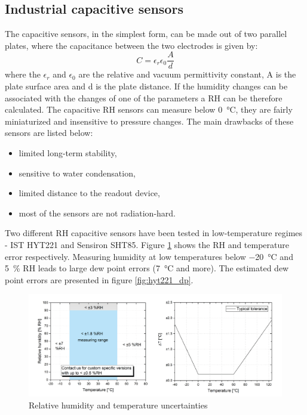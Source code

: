 \subsection{Industrial capacitive sensors}
\label{capacitive_sensors}
The capacitive sensors, in the simplest form, can be made out of two parallel plates, where the capacitance between the two electrodes is given by:
\begin{equation}
C = \epsilon_{r}\epsilon_0\frac{A}{d}
\end{equation}
where the $\epsilon_{r}$ and $\epsilon_{0}$ are the relative and vacuum permittivity constant, A is the plate surface area and d is the plate distance. If the humidity changes can be associated with the changes of one of the parameters a \gls{RH} can be therefore calculated. 
The capacitive \gls{RH} sensors can measure below \SI{0}{\celsius}, they are fairly miniaturized and insensitive to pressure changes. The main drawbacks of these sensors are listed below:
\begin{itemize}
    \item limited long-term stability,
    \item sensitive to water condensation,
    \item limited distance to the readout device,
    \item most of the sensors are not radiation-hard.
\end{itemize}
Two different \gls{RH} capacitive sensors have been tested in low-temperature regimes - IST HYT221 and Sensiron SHT85. Figure \ref{fig:hyt221} shows the \gls{RH} and temperature error respectively. Measuring humidity at low temperatures below \SI{-20}{\celsius} and 5~\% \gls{RH} leads to large dew point errors (\SI{7}{\celsius} and more). The estimated dew point errors are presented in figure \ref{fig:hyt221_dp}.
\begin{figure}[!h]
\centering
\includegraphics[width=0.85\columnwidth]{Chapter5/images/hyt221_rh.png}
\caption{Relative humidity and temperature uncertainties \cite{hyt221}}
\label{fig:hyt221}
\end{figure}
